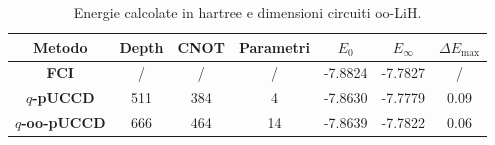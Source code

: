 \begin{table}[H]
    \centering
    \begin{tabular}{|c|c|c|c|c|c|c|}
    \hline
    \textbf{Metodo}                                              & \textbf{Depth} & \textbf{CNOT} & \textbf{Parametri} & \textbf{$E_0$} & \textbf{$E_\infty$} & \textbf{$\Delta E_{\text{max}}$} \\ \hline
    \textbf{\color[HTML]{CB0000} FCI}       & /              & /             & /                  & -7.8824        & -7.7827             & /                                \\ \hline
    \textbf{\color[HTML]{D952D8} $q$-pUCCD} & 511            & 384           & 4                  & -7.8630        & -7.7779             & 0.09                             \\ \hline
    \textbf{\color[HTML]{6200C9} $q$-oo-pUCCD}               & 666           & 464           & 14                 & -7.8639        & -7.7822             & 0.06                             \\ \hline
\end{tabular}
\caption{Energie calcolate in hartree e dimensioni circuiti oo-LiH.}
\label{tab:oo-LiH}
\end{table}